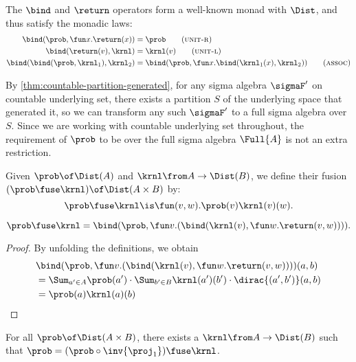 \documentclass[acmsmall,nonacm,screen,appendix]{acmart}
\begin{document}
The $\bind$ and $\return$ operators form a well-known monad with
$\Dist$, and thus satisfy the monadic laws:
\begin{align*}
  \bind(\prob,\fun x.\return(x)) &= \prob
  \tag{\textsc{unit-r}}
  \label{prop:bind-unit-r}
  \\
  \bind(\return(v),\krnl) &= \krnl(v)
  \tag{\textsc{unit-l}}
  \label{prop:bind-unit-l}
  \\
  \bind(\bind(\prob,\krnl_1),\krnl_2) &=
    \bind(\prob,\fun x.\bind(\krnl_1(x),\krnl_2))
  \tag{\textsc{assoc}}
  \label{prop:bind-assoc}
\end{align*}

By \cref{thm:countable-partition-generated},
for any sigma algebra $\sigmaF'$ on countable underlying set, there exists
a partition $S$ of the underlying space that generated it, so we can transform
any such $\sigmaF'$ to a full sigma algebra over $S$.
Since we are working with countable underlying set throughout,
the requirement of $\prob$ to be over the full sigma algebra $\Full{A}$ is not an extra restriction.

\begin{definition}
  Given $\prob \of \Dist(A)$ and $\krnl \from A \to \Dist(B)$,
  we define their fusion $(\prob \fuse \krnl) \of \Dist(A \times B)$
  by:
  \[
    \prob\fuse\krnl \is
      \fun(v,w). \prob(v)\krnl(v)(w).
  \]
\end{definition}

\begin{proposition}
  $
    \prob\fuse\krnl =
    \bind(\prob,\fun v.(\bind(\krnl(v), \fun w.\return(v,w)))).
  $
\end{proposition}

\begin{proof}
  By unfolding the definitions, we obtain
  \begin{align*}
    &\bind(\prob,\fun v.(\bind(\krnl(v), \fun w.\return(v,w))))(a,b)
    \\
    &=
    \Sum_{a'\in A}
      \prob(a') \cdot
      \Sum_{b'\in B}
        \krnl(a')(b')\cdot\dirac{(a',b')}(a,b)
    \\&= \prob(a)\krnl(a)(b)
    \qedhere
  \end{align*}
\end{proof}

\begin{lemma}\label{lm:fuse-split}
  For all $\prob \of \Dist(A\times B)$,
  there exists a $\krnl \from A \to \Dist(B)$
  such that
  $ \prob = (\prob \circ \inv{\proj_1})\fuse\krnl $.
\end{lemma}
\end{document}
